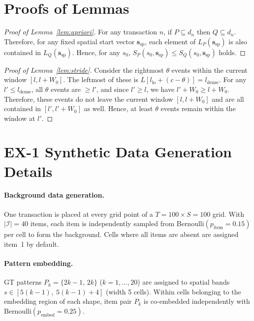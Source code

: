 \section{Proofs of Lemmas}
\label{sec:proofs}

\begin{proof}[Proof of Lemma~\ref{lem:apriori}]
For any transaction $n$, if $P \subseteq d_n$ then $Q \subseteq d_n$.
Therefore, for any fixed spatial start vector $\bm{s}_{\mathrm{sp}}$,
each element of $L_P(\bm{s}_{\mathrm{sp}})$
is also contained in $L_Q(\bm{s}_{\mathrm{sp}})$.
Hence, for any $s_0$,
$S_P(s_0,\bm{s}_{\mathrm{sp}}) \leq S_Q(s_0,\bm{s}_{\mathrm{sp}})$ holds.
\end{proof}

\begin{proof}[Proof of Lemma~\ref{lem:stride}]
Consider the rightmost $\theta$ events within the current window
$[l, l+W_0]$.
The leftmost of these is $L[l_{\mathrm{lo}} + (c-\theta)] = l_{\mathrm{dense}}$.
For any $l' \leq l_{\mathrm{dense}}$,
all $\theta$ events are $\geq l'$,
and since $l' \geq l$, we have $l'+W_0 \geq l+W_0$.
Therefore, these events do not leave the current window $[l,l+W_0]$
and are all contained in $[l', l'+W_0]$ as well.
Hence, at least $\theta$ events remain within the window at $l'$.
\end{proof}


\section{EX-1 Synthetic Data Generation Details}
\label{sec:ex1_data_details}

\paragraph{Background data generation.}
One transaction is placed at every grid point of a
$T{=}100 \times S{=}100$ grid.
With $|\mathcal{I}|{=}40$ items,
each item is independently sampled from
Bernoulli$(p_{\mathrm{item}}{=}0.15)$ per cell to form the background.
Cells where all items are absent are assigned item~1 by default.

\paragraph{Pattern embedding.}
GT patterns $P_k = \{2k{-}1,\, 2k\}$ ($k=1,\ldots,20$)
are assigned to spatial bands
$s \in [5(k{-}1),\; 5(k{-}1){+}4]$ (width 5 cells).
Within cells belonging to the embedding region of each shape,
item pair $P_k$ is co-embedded independently with
Bernoulli$(p_{\mathrm{embed}}{=}0.25)$.

